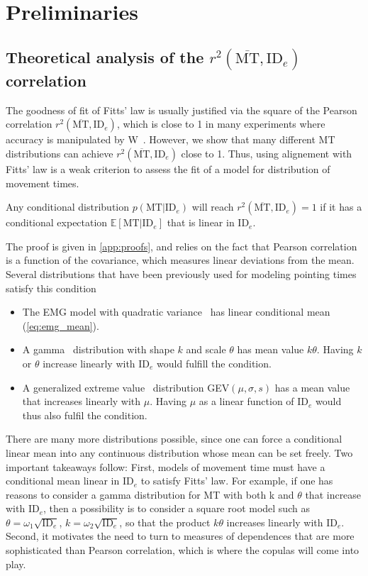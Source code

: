 \documentclass[acmlarge, manuscript,review]{acmart}
\newcommand{\mmt}{\ensuremath{\overline{\mt}}\xspace}
\newcommand{\mt}{\ensuremath{{\text{MT}}}\xspace}
\newcommand{\ide}{\ensuremath{{\text{ID}_e}}\xspace}
\begin{document}
\section{Preliminaries}

\subsection{Theoretical analysis of the $r^2(\mmt, \ide)$ correlation \label{subs:theory_rsq}}


The goodness of fit of Fitts' law is usually justified via the square of the Pearson correlation $r^2(\mmt, \ide)$, which is close to 1 in many experiments where accuracy is manipulated by W~\cite{soukoreff2004}.
However, we show that many different MT distributions can achieve $r^2(\mmt, \ide)$ close to 1. Thus, using alignement with Fitts' law is a weak criterion to assess the fit of a model for distribution of movement times.

\begin{proposition}\label{prop}
	Any conditional distribution $p(\mt|\ide)$ will reach $r^2(\mmt, \ide) = 1$ if it has a conditional expectation $\mathbb{E}[\mt|\ide]$ that is linear in \ide.
\end{proposition}

The proof is given in \autoref{app:proofs}, and relies on the fact that Pearson correlation is a function of the covariance, which measures linear deviations from the mean. Several distributions that have been previously used for modeling pointing times satisfy this condition
\begin{itemize}
	\item The EMG model with quadratic variance~\cite{gori2018these,gori2019, li2024,zhao2022} has linear conditional mean (\autoref{eq:emg_mean}).
	\item A gamma~\cite{jude2016} distribution with shape $k$ and scale $\theta$ has mean value $k\theta$. Having $k$ or $\theta$ increase linearly with \ide would fulfill the condition.
	\item A generalized extreme value~\cite{chapuis2007} distribution GEV$(\mu, \sigma, s)$ has a mean value that increases linearly with $\mu$. Having $\mu$ as a linear function of \ide would thus also fulfil the condition.
\end{itemize}
There are many more distributions possible, since one can force a conditional linear mean into any continuous distribution whose mean can be set freely.
Two important takeaways follow: First, models of movement time must have a conditional mean linear in \ide to satisfy Fitts' law. For example, if one has reasons to consider a gamma distribution for MT with both k and $\theta$ that increase with \ide, then a possibility is to consider a square root model such as $\theta = \omega_1 \sqrt{\ide}$, $k = \omega_2 \sqrt{\ide}$, so that the product $k\theta$ increases linearly with \ide.
Second, it motivates the need to turn to measures of dependences that are more sophisticated than Pearson correlation, which is where the copulas will come into play.
\end{document}
